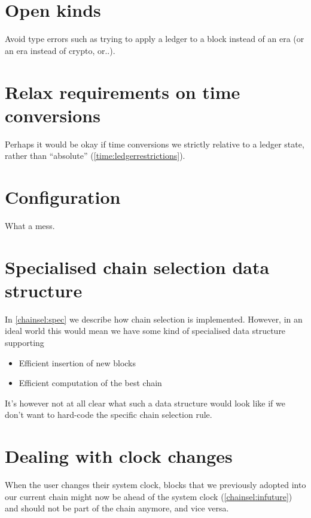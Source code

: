 \section{Open kinds}
\label{future:openkinds}

Avoid type errors such as trying to apply a ledger to a block instead of an era
(or an era instead of crypto, or..).

\section{Relax requirements on time conversions}
\label{future:relax-time-requirements}

Perhaps it would be okay if time conversions we strictly relative to a ledger
state, rather than ``absolute'' (\cref{time:ledgerrestrictions}).

\section{Configuration}

What a mess.

\section{Specialised chain selection data structure}

In \cref{chainsel:spec} we describe how chain selection is implemented. However,
in an ideal world this would mean we have some kind of specialised data
structure supporting

\begin{itemize}
\item Efficient insertion of new blocks
\item Efficient computation of the best chain
\end{itemize}

It's however not at all clear what such a data structure would look like if we
don't want to hard-code the specific chain selection rule.

\section{Dealing with clock changes}
\label{future:clockchanges}

When the user changes their system clock, blocks that we previously adopted
into our current chain might now be ahead of the system clock (\cref{chainsel:infuture}) and should not
be part of the chain anymore, and vice versa.

